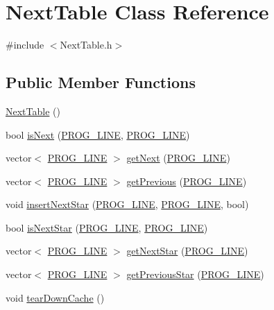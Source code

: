 \hypertarget{class_next_table}{\section{Next\-Table Class Reference}
\label{class_next_table}
}


{\ttfamily \#include $<$Next\-Table.\-h$>$}

\subsection*{Public Member Functions}
\begin{DoxyCompactItemize}
\item 
\hyperlink{class_next_table_a344fb8f2a8c274a512f3abb49d0e4b29}{Next\-Table} ()
\item 
bool \hyperlink{class_next_table_ad6e18ab145a544c9606782ea980da829}{is\-Next} (\hyperlink{std_afx_8h_abcc2d0120d16c2587a85b314010f6399}{P\-R\-O\-G\-\_\-\-L\-I\-N\-E}, \hyperlink{std_afx_8h_abcc2d0120d16c2587a85b314010f6399}{P\-R\-O\-G\-\_\-\-L\-I\-N\-E})
\item 
vector$<$ \hyperlink{std_afx_8h_abcc2d0120d16c2587a85b314010f6399}{P\-R\-O\-G\-\_\-\-L\-I\-N\-E} $>$ \hyperlink{class_next_table_a940612dcc385a8b98e09a7d4a7a2ac9c}{get\-Next} (\hyperlink{std_afx_8h_abcc2d0120d16c2587a85b314010f6399}{P\-R\-O\-G\-\_\-\-L\-I\-N\-E})
\item 
vector$<$ \hyperlink{std_afx_8h_abcc2d0120d16c2587a85b314010f6399}{P\-R\-O\-G\-\_\-\-L\-I\-N\-E} $>$ \hyperlink{class_next_table_a6e68bd6a0eb30d68751a9d2fefbfc170}{get\-Previous} (\hyperlink{std_afx_8h_abcc2d0120d16c2587a85b314010f6399}{P\-R\-O\-G\-\_\-\-L\-I\-N\-E})
\item 
void \hyperlink{class_next_table_a6496a8536a757a4500ca6d3ed6fb120e}{insert\-Next\-Star} (\hyperlink{std_afx_8h_abcc2d0120d16c2587a85b314010f6399}{P\-R\-O\-G\-\_\-\-L\-I\-N\-E}, \hyperlink{std_afx_8h_abcc2d0120d16c2587a85b314010f6399}{P\-R\-O\-G\-\_\-\-L\-I\-N\-E}, bool)
\item 
bool \hyperlink{class_next_table_a98e38cd5853a0b8730e985b386164f4c}{is\-Next\-Star} (\hyperlink{std_afx_8h_abcc2d0120d16c2587a85b314010f6399}{P\-R\-O\-G\-\_\-\-L\-I\-N\-E}, \hyperlink{std_afx_8h_abcc2d0120d16c2587a85b314010f6399}{P\-R\-O\-G\-\_\-\-L\-I\-N\-E})
\item 
vector$<$ \hyperlink{std_afx_8h_abcc2d0120d16c2587a85b314010f6399}{P\-R\-O\-G\-\_\-\-L\-I\-N\-E} $>$ \hyperlink{class_next_table_a6dbfbe566bd1c8503c6069aff8807913}{get\-Next\-Star} (\hyperlink{std_afx_8h_abcc2d0120d16c2587a85b314010f6399}{P\-R\-O\-G\-\_\-\-L\-I\-N\-E})
\item 
vector$<$ \hyperlink{std_afx_8h_abcc2d0120d16c2587a85b314010f6399}{P\-R\-O\-G\-\_\-\-L\-I\-N\-E} $>$ \hyperlink{class_next_table_a4d721bef451e71744b4d066b477667e5}{get\-Previous\-Star} (\hyperlink{std_afx_8h_abcc2d0120d16c2587a85b314010f6399}{P\-R\-O\-G\-\_\-\-L\-I\-N\-E})
\item 
void \hyperlink{class_next_table_a88fcfe96e9d5be528a741f709387002c}{tear\-Down\-Cache} ()
\end{DoxyCompactItemize}


